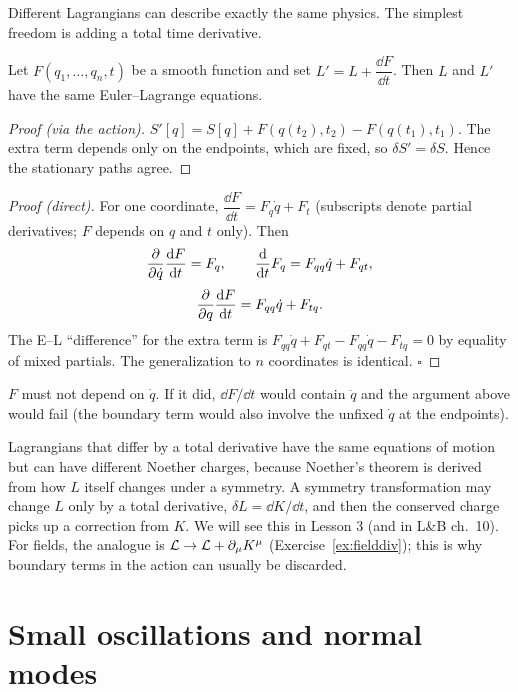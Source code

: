 \documentclass[11pt]{article}
\begin{document}
Different Lagrangians can describe exactly the same physics. The simplest freedom is adding a total time derivative.

\begin{proposition}
Let $F(q_1,\dots,q_n,t)$ be a smooth function and set $L'=L+\dfrac{\dd F}{\dd t}$. Then $L$ and $L'$ have the same Euler--Lagrange equations.
\end{proposition}

\begin{proof}[Proof (via the action)]
$S'[q]=S[q]+F(q(t_2),t_2)-F(q(t_1),t_1)$. The extra term depends only on the endpoints, which are fixed, so $\delta S'=\delta S$. Hence the stationary paths agree.
\end{proof}

\begin{proof}[Proof (direct)]
For one coordinate, $\dfrac{\dd F}{\dd t}=F_q\dot q+F_t$ (subscripts denote partial derivatives; $F$ depends on $q$ and $t$ only). Then
\[
  \frac{\partial }{\partial \dot q}\frac{\mathrm{d} F}{\mathrm{d} t}=F_q,\qquad \frac{\mathrm{d} }{\mathrm{d} t}F_q=F_{qq}\dot q+F_{qt},
\]
\[
  \frac{\partial }{\partial q}\frac{\mathrm{d} F}{\mathrm{d} t}=F_{qq}\dot q+F_{tq}.
\]
The E--L ``difference'' for the extra term is $F_{qq}\dot q+F_{qt}-F_{qq}\dot q-F_{tq}=0$ by equality of mixed partials. The generalization to $n$ coordinates is identical. $\square$
\end{proof}

\begin{pitfall}
$F$ must not depend on $\dot q$. If it did, $\dd F/\dd t$ would contain $\ddot q$ and the argument above would fail (the boundary term would also involve the unfixed $\dot q$ at the endpoints).
\end{pitfall}

\begin{qftbridge}
Lagrangians that differ by a total derivative have the same equations of motion but can have different Noether charges, because Noether's theorem is derived from how $L$ itself changes under a symmetry. A symmetry transformation may change $L$ only by a total derivative, $\delta L=\dd K/\dd t$, and then the conserved charge picks up a correction from $K$. We will see this in Lesson 3 (and in L\&B ch.~10). For fields, the analogue is $\mathcal{L}\to\mathcal{L}+\partial_\mu K^\mu$ (Exercise~\ref{ex:fielddiv}); this is why boundary terms in the action can usually be discarded.
\end{qftbridge}

\section{Small oscillations and normal modes}
\end{document}
